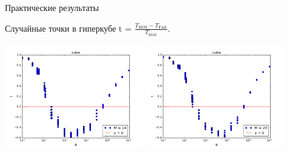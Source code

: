 \documentclass{beamer}
\begin{document}
\begin{frame}{Практические результаты}
\begin{block}{Случайные точки в гиперкубе}
t = $\frac{T_\text{BOS} - T_\text{Fast}}{T_\text{max}}$.
\begin{table}[h]
\begin{center}
\includegraphics[width=6cm]{pic/cube_m=14}
\includegraphics[width=6cm]{pic/cube_m=20}
\end{center}
\end{table}
\end{block}
\end{frame}
\end{document}
